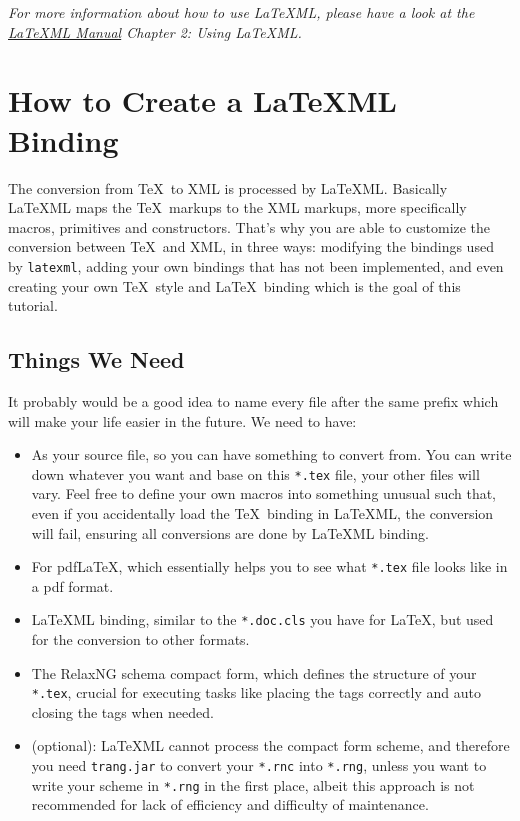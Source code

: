 \documentclass{article}
\begin{document}
\begin{tcolorbox}
\emph{For more information about how to use \LaTeX ML, please have a look at the \href{http://dlmf.nist.gov/LaTeXML/manual.pdf}{\LaTeX ML Manual} Chapter 2: Using \LaTeX ML.}
\end{tcolorbox}

\section{How to Create a LaTeXML Binding}
The conversion from \TeX\  to XML is processed by \LaTeX ML. Basically \LaTeX ML maps the \TeX \ markups to the XML markups, more specifically macros, primitives and constructors. That's why you are able to customize the conversion between \TeX\  and XML, in three ways: modifying the bindings used by \texttt{latexml}, adding your own bindings that has not been implemented, and even creating your own \TeX \ style and \LaTeX\  binding which is the goal of this tutorial.
\subsection{Things We Need}
It probably would be a good idea to name every file after the same prefix which will make your life easier in the future. We need to have:
\begin{itemize}
\item[\texttt{*.tex}] As your source file, so you can have something to convert from. You can write down whatever you want and base on this \texttt{*.tex} file, your other files will vary. Feel free to define your own macros into something unusual such that, even if you accidentally load the \TeX\ binding in \LaTeX ML, the conversion will fail, ensuring all conversions are done by \LaTeX ML binding. \\

\item[\texttt{*.cls}] For pdf\LaTeX, which essentially helps you to see what \texttt{*.tex} file looks like in a pdf format. \\ 

\item[\texttt{*.cls.ltxml}] \LaTeX ML binding, similar to the \texttt{*.doc.cls} you have for \LaTeX, but used for the conversion to other formats. \\

\item[\texttt{*.rnc}] The RelaxNG schema compact form, which defines the structure of your \texttt{*.tex}, crucial for executing tasks like placing the tags correctly and auto closing the tags when needed. \\

\item[\texttt{trang.jar}](optional): \LaTeX ML cannot process the compact form scheme, and therefore you need \texttt{trang.jar} to convert your \texttt{*.rnc} into \texttt{*.rng}, unless you want to write your scheme in \texttt{*.rng} in the first place, albeit this approach is not recommended for lack of efficiency and difficulty of maintenance.
\end{itemize}
\end{document}

